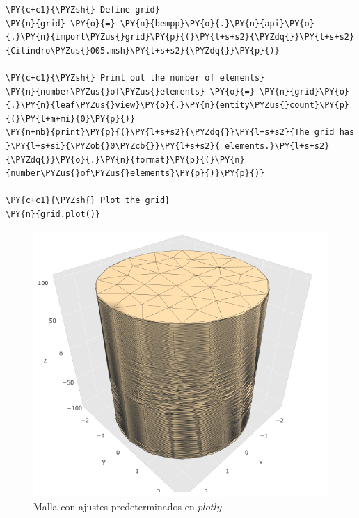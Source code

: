 \begin{tcolorbox}
\begin{Verbatim}[commandchars=\\\{\}]
\PY{c+c1}{\PYZsh{} Define grid}
\PY{n}{grid} \PY{o}{=} \PY{n}{bempp}\PY{o}{.}\PY{n}{api}\PY{o}{.}\PY{n}{import\PYZus{}grid}\PY{p}{(}\PY{l+s+s2}{\PYZdq{}}\PY{l+s+s2}{Cilindro\PYZus{}005.msh}\PY{l+s+s2}{\PYZdq{}}\PY{p}{)}

\PY{c+c1}{\PYZsh{} Print out the number of elements}
\PY{n}{number\PYZus{}of\PYZus{}elements} \PY{o}{=} \PY{n}{grid}\PY{o}{.}\PY{n}{leaf\PYZus{}view}\PY{o}{.}\PY{n}{entity\PYZus{}count}\PY{p}{(}\PY{l+m+mi}{0}\PY{p}{)}    
\PY{n+nb}{print}\PY{p}{(}\PY{l+s+s2}{\PYZdq{}}\PY{l+s+s2}{The grid has }\PY{l+s+si}{\PYZob{}0\PYZcb{}}\PY{l+s+s2}{ elements.}\PY{l+s+s2}{\PYZdq{}}\PY{o}{.}\PY{n}{format}\PY{p}{(}\PY{n}{number\PYZus{}of\PYZus{}elements}\PY{p}{)}\PY{p}{)}

\PY{c+c1}{\PYZsh{} Plot the grid}
\PY{n}{grid.plot()}
\end{Verbatim}
\end{tcolorbox}
\begin{figure}[H]
\centering
\includegraphics[scale=0.9]{Imagenes/graficas/Situacion 1/Malla/malla 1.png} 
\caption{Malla con ajustes predeterminados en $plotly$}
\end{figure}
